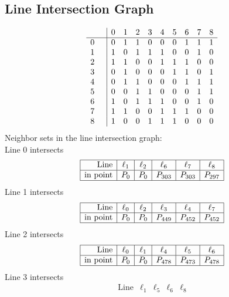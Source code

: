 \documentclass{article}
\begin{document}
{\subsection*{Line Intersection Graph}
{\arraycolsep=1pt
$$
\begin{array}{rr|*{9}r}
 &  & 0 & 1 & 2 & 3 & 4 & 5 & 6 & 7 & 8\\
\hline
0 &  & 0 & 1 & 1 & 0 & 0 & 0 & 1 & 1 & 1\\
1 &  & 1 & 0 & 1 & 1 & 1 & 0 & 0 & 1 & 0\\
2 &  & 1 & 1 & 0 & 0 & 1 & 1 & 1 & 0 & 0\\
3 &  & 0 & 1 & 0 & 0 & 0 & 1 & 1 & 0 & 1\\
4 &  & 0 & 1 & 1 & 0 & 0 & 0 & 1 & 1 & 1\\
5 &  & 0 & 0 & 1 & 1 & 0 & 0 & 0 & 1 & 1\\
6 &  & 1 & 0 & 1 & 1 & 1 & 0 & 0 & 1 & 0\\
7 &  & 1 & 1 & 0 & 0 & 1 & 1 & 1 & 0 & 0\\
8 &  & 1 & 0 & 0 & 1 & 1 & 1 & 0 & 0 & 0\\
\end{array}
$$
}%
Neighbor sets in the line intersection graph:\\
Line 0 intersects 
$$
\begin{array}{|r*{5}{|c}|}
\hline
\mbox{Line}  & \ell_{1} & \ell_{2} & \ell_{6} & \ell_{7} & \ell_{8}\\
\hline
\mbox{in point}  & P_{0} & P_{0} & P_{303} & P_{303} & P_{297}\\
\hline
\end{array}
$$
Line 1 intersects 
$$
\begin{array}{|r*{5}{|c}|}
\hline
\mbox{Line}  & \ell_{0} & \ell_{2} & \ell_{3} & \ell_{4} & \ell_{7}\\
\hline
\mbox{in point}  & P_{0} & P_{0} & P_{449} & P_{452} & P_{452}\\
\hline
\end{array}
$$
Line 2 intersects 
$$
\begin{array}{|r*{5}{|c}|}
\hline
\mbox{Line}  & \ell_{0} & \ell_{1} & \ell_{4} & \ell_{5} & \ell_{6}\\
\hline
\mbox{in point}  & P_{0} & P_{0} & P_{478} & P_{473} & P_{478}\\
\hline
\end{array}
$$
Line 3 intersects 
$$
\begin{array}{|r*{4}{|c}|}
\hline
\mbox{Line}  & \ell_{1} & \ell_{5} & \ell_{6} & \ell_{8}\\

\end{array}$$}
\end{document}
